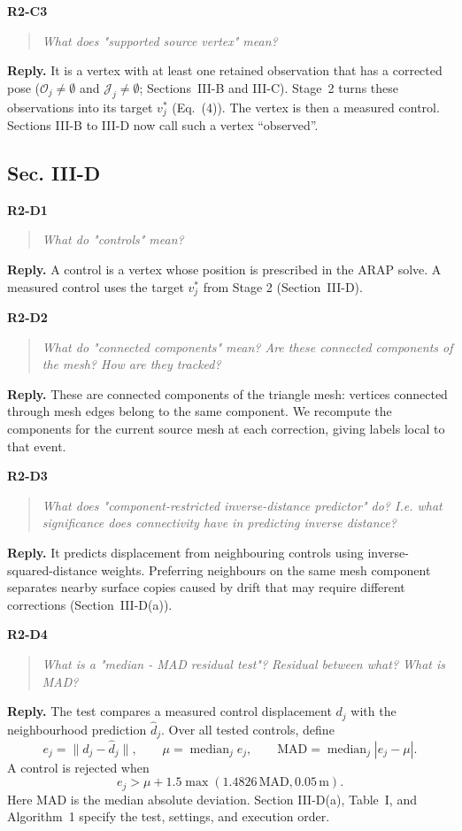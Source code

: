 \documentclass[11pt,a4paper]{article}
\newcommand{\point}[2]{\par\medskip\textbf{#1}\par\begin{quote}\itshape #2\end{quote}}
\newenvironment{reply}{\begingroup\color{replyblue}\textbf{Reply.} }{\par\endgroup}
\begin{document}
\point{R2-C3}{What does "supported source vertex" mean?}
\begin{reply}
It is a vertex with at least one retained observation that has a corrected pose ($\mathcal O_j\neq\emptyset$ and $\mathcal J_j\neq\emptyset$; Sections~III-B and III-C). Stage~2 turns these observations into its target $v_j^*$ (Eq.~(4)). The vertex is then a measured control. Sections III-B to III-D now call such a vertex ``observed''.
\end{reply}

\subsection*{Sec. III-D}

\point{R2-D1}{What do "controls" mean?}
\begin{reply}
A control is a vertex whose position is prescribed in the ARAP solve. A measured control uses the target $v_j^*$ from Stage 2 (Section~III-D).
\end{reply}

\point{R2-D2}{What do "connected components" mean? Are these connected components of the mesh? How are they tracked?}
\begin{reply}
These are connected components of the triangle mesh: vertices connected through mesh edges belong to the same component. We recompute the components for the current source mesh at each correction, giving labels local to that event.
\end{reply}

\point{R2-D3}{What does "component-restricted inverse-distance predictor" do? I.e. what significance does connectivity have in predicting inverse distance?}
\begin{reply}
It predicts displacement from neighbouring controls using inverse-squared-distance weights. Preferring neighbours on the same mesh component separates nearby surface copies caused by drift that may require different corrections (Section~III-D(a)).
\end{reply}

\point{R2-D4}{What is a "median - MAD residual test"? Residual between what? What is MAD?}
\begin{reply}
The test compares a measured control displacement $d_j$ with the neighbourhood prediction $\hat d_j$. Over all tested controls, define
\[
e_j=\|d_j-\hat d_j\|,\qquad
\mu=\operatorname{median}_j e_j,\qquad
\mathrm{MAD}=\operatorname{median}_j|e_j-\mu|.
\]
A control is rejected when
\[
e_j>\mu+1.5\max(1.4826\,\mathrm{MAD},0.05\,\mathrm{m}).
\]
Here MAD is the median absolute deviation. Section III-D(a), Table~I, and Algorithm~1 specify the test, settings, and execution order.
\end{reply}
\end{document}
